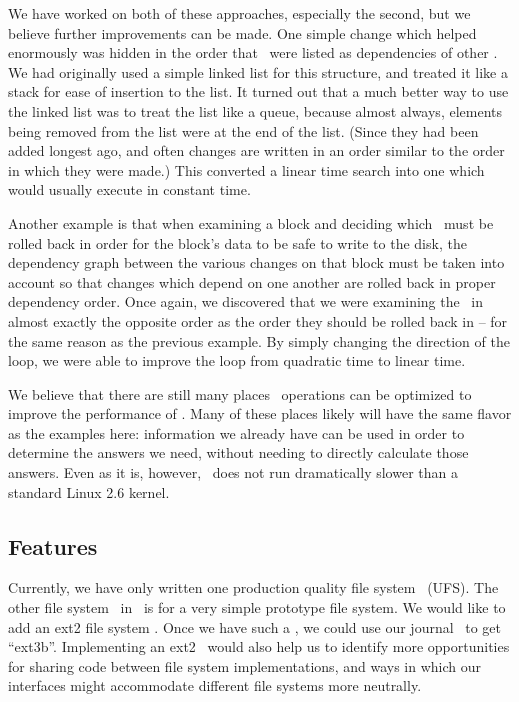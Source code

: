 We have worked on both of these approaches, especially the second, but we
believe further improvements can be made. One simple change which helped
enormously was hidden in the order that \chdescs\ were listed as dependencies of
other \chdescs. We had originally used a simple linked list for this structure,
and treated it like a stack for ease of insertion to the list. It turned out
that a much better way to use the linked list was to treat the list like a
queue, because almost always, elements being removed from the list were at the
end of the list. (Since they had been added longest ago, and often changes are
written in an order similar to the order in which they were made.) This
converted a linear time search into one which would usually execute in constant
time.

Another example is that when examining a block and deciding which \chdescs\ must
be rolled back in order for the block's data to be safe to write to the disk,
the dependency graph between the various changes on that block must be taken
into account so that changes which depend on one another are rolled back in
proper dependency order. Once again, we discovered that we were examining the
\chdescs\ in almost exactly the opposite order as the order they should be
rolled back in -- for the same reason as the previous example. By simply
changing the direction of the loop, we were able to improve the loop from
quadratic time to linear time.

We believe that there are still many places \chdesc\ operations can be optimized
to improve the performance of \Kudos. Many of these places likely will have the
same flavor as the examples here: information we already have can be used in
order to determine the answers we need, without needing to directly calculate
those answers. Even as it is, however, \Kudos\ does not run dramatically slower
than a standard Linux 2.6 kernel.


\subsection {Features}
Currently, we have only written one production quality file system \module\
(UFS). The other file system \module\ in \Kudos\ is for a very simple prototype
file system. We would like to add an ext2 file system \module. Once we have such
a \module, we could use our journal \module\ to get ``ext3b''. Implementing an
ext2 \module\ would also help us to identify more opportunities for sharing code
between file system implementations, and ways in which our interfaces might
accommodate different file systems more neutrally.

